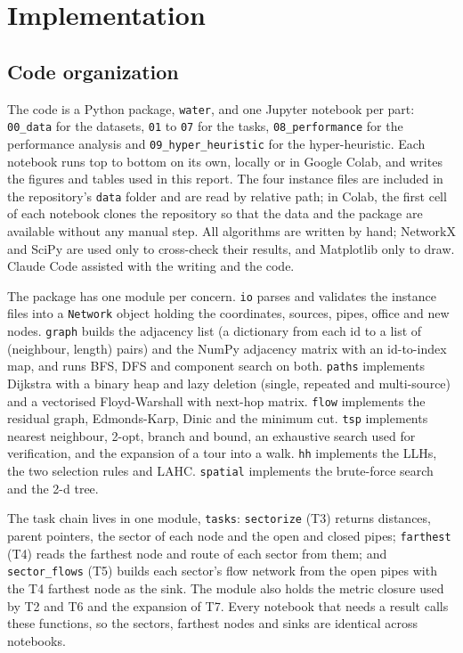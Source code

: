\section{Implementation}\label{sec:implementation}

\subsection{Code organization}
The code is a Python package, \texttt{water}, and one Jupyter notebook per part: \texttt{00\_data} for the datasets, \texttt{01} to \texttt{07} for the tasks, \texttt{08\_performance} for the performance analysis and \texttt{09\_hyper\_heuristic} for the hyper-heuristic. Each notebook runs top to bottom on its own, locally or in Google Colab, and writes the figures and tables used in this report. The four instance files are included in the repository's \texttt{data} folder and are read by relative path; in Colab, the first cell of each notebook clones the repository so that the data and the package are available without any manual step. All algorithms are written by hand; NetworkX and SciPy are used only to cross-check their results, and Matplotlib only to draw. Claude Code \citep{claude_code} assisted with the writing and the code.

The package has one module per concern. \texttt{io} parses and validates the instance files into a \texttt{Network} object holding the coordinates, sources, pipes, office and new nodes. \texttt{graph} builds the adjacency list (a dictionary from each id to a list of (neighbour, length) pairs) and the NumPy adjacency matrix with an id-to-index map, and runs BFS, DFS and component search on both. \texttt{paths} implements Dijkstra with a binary heap and lazy deletion (single, repeated and multi-source) and a vectorised Floyd-Warshall with next-hop matrix. \texttt{flow} implements the residual graph, Edmonds-Karp, Dinic and the minimum cut. \texttt{tsp} implements nearest neighbour, 2-opt, branch and bound, an exhaustive search used for verification, and the expansion of a tour into a walk. \texttt{hh} implements the LLHs, the two selection rules and LAHC. \texttt{spatial} implements the brute-force search and the 2-d tree.

The task chain lives in one module, \texttt{tasks}: \texttt{sectorize} (T3) returns distances, parent pointers, the sector of each node and the open and closed pipes; \texttt{farthest} (T4) reads the farthest node and route of each sector from them; and \texttt{sector\_flows} (T5) builds each sector's flow network from the open pipes with the T4 farthest node as the sink. The module also holds the metric closure used by T2 and T6 and the expansion of T7. Every notebook that needs a result calls these functions, so the sectors, farthest nodes and sinks are identical across notebooks.


